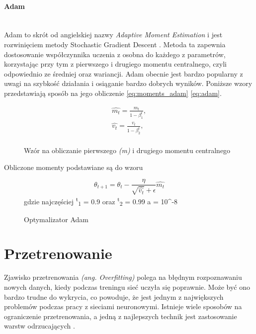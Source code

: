 \paragraph{Adam} \mbox{}\\
Adam to skrót od angielskiej nazwy \textit{Adaptive Moment Estimation} i jest rozwinięciem
metody Stochastic Gradient Descent \cite{AdamOptimizer, OptimizersOverview}.
Metoda ta zapewnia dostosowanie współczynnika uczenia z osobna do każdego z parametrów,
korzystając przy tym z pierwszego i drugiego momentu centralnego, czyli odpowiednio ze
średniej oraz wariancji. Adam obecnie jest bardzo popularny z uwagi na szybkość działania
i osiąganie bardzo dobrych wyników. Poniższe wzory przedstawiają sposób na jego obliczenie \ref{eq:moments_adam} \ref{eq:adam}.
\begin{figure}[h!]
\renewcommand{\figurename}{Wzór}%
\begin{equation} \label{eq:moments_adam}
\begin{align*}
\hat{m_t} = \frac{m_t} {1 - \beta^t_1}, \\
\hat{v_t} = \frac{v_t} {1 - \beta^t_2}, \\
\end{align*}
\end{equation}
\caption{Wzór na obliczanie pierwszego \textit{(m)} i drugiego  momentu centralnego}
\end{figure}
Obliczone momenty podstawiane są do wzoru
\begin{figure}[h!]
\renewcommand{\figurename}{Wzór}%
\begin{equation} \label{eq:adam}
\theta_{t+1} = \theta_t - \frac {\eta} {\sqrt{\hat{v_t}} + \epsilon} \hat{m_t}
\end{equation}
\centering
gdzie najczęściej \textbeta \textsuperscript{t}\textsubscript{1} = 0.9 oraz
\textbeta \textsuperscript{t}\textsubscript{2} = 0.99 a \straightepsilon = 10^{-8}\\
\caption{Optymalizator Adam}
\end{figure}

\section{Przetrenowanie}
Zjawisko przetrenowania \textit{(ang. Overfitting)} polega na błędnym rozpoznawaniu nowych danych,
kiedy podczas treningu sieć uczyła się poprawnie. Może być ono bardzo trudne do wykrycia,
co powoduje, że jest jednym z największych problemów podczas pracy z sieciami neuronowymi.
Istnieje wiele sposobów na ograniczenie przetrenowania, a jedną z najlepszych technik
jest zastosowanie warstw odrzucających \cite{DropoutPreventOverfit}.

